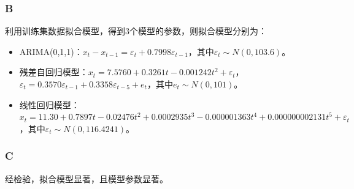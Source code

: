 \documentclass[12pt,a4paper]{article}
\begin{document}
    \subsubsection*{B}
    利用训练集数据拟合模型，得到3个模型的参数，则拟合模型分别为：
    \begin{itemize}
        \item ARIMA(0,1,1)：$x_t-x_{t-1}=\varepsilon_t+0.7998\varepsilon_{t-1}$，其中$\varepsilon_t\sim N(0,103.6)$。
        \item 残差自回归模型：$x_t=7.5760+0.3261t-0.001242t^2+\varepsilon_t$，$\varepsilon_t=0.3570\varepsilon_{t-1}+0.3358\varepsilon_{t-5}+e_t$，其中$e_t\sim N(0,101)$。
        \item 线性回归模型：$x_t=11.30+0.7897t-0.02476t^2+0.0002935t^3-0.000001363t^4+0.000000002131t^5+\varepsilon_t$，其中$\varepsilon_t\sim N(0,116.4241)$。
    \end{itemize}
    \subsubsection*{C}
    经检验，拟合模型显著，且模型参数显著。
\end{document}
